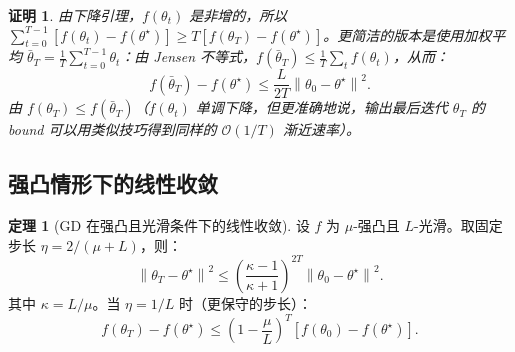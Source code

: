 \documentclass[12pt,a4paper]{ctexart}
\theoremstyle{definition}
\newtheorem{theorem}{定理}[section]
\theoremstyle{plain}
\newtheorem*{proof*}{证明}
\newcommand{\norm}[1]{\left\lVert #1 \right\rVert}
\begin{document}
\begin{proof*}
  由下降引理，$f(\theta_t)$ 是非增的，所以 $\sum_{t=0}^{T-1}[f(\theta_t) - f(\theta^\star)] \ge T[f(\theta_T) - f(\theta^\star)]$。更简洁的版本是使用加权平均
  $\bar\theta_T = \frac1T \sum_{t=0}^{T-1}\theta_t$：由 Jensen 不等式，$f(\bar\theta_T) \le \frac1T\sum_t f(\theta_t)$，从而：
  \begin{equation}
    f(\bar\theta_T) - f(\theta^\star) \le \frac{L}{2T} \norm{\theta_0 - \theta^\star}^2.
  \end{equation}
  由 $f(\theta_T) \le f(\bar\theta_T)$（$f(\theta_t)$ 单调下降，但更准确地说，输出最后迭代 $\theta_T$ 的 bound 可以用类似技巧得到同样的 $\mathcal{O}(1/T)$ 渐近速率）。
\end{proof*}

\subsection{强凸情形下的线性收敛}

\begin{theorem}[GD 在强凸且光滑条件下的线性收敛]\label{thm:gd-strconv}
  设 $f$ 为 $\mu$-强凸且 $L$-光滑。取固定步长 $\eta = 2/(\mu + L)$，则：
  \begin{equation}\label{eq:gd-linear}
    \norm{\theta_T - \theta^\star}^2 \le \left(\frac{\kappa - 1}{\kappa + 1}\right)^{2T} \norm{\theta_0 - \theta^\star}^2.
  \end{equation}
  其中 $\kappa = L/\mu$。当 $\eta = 1/L$ 时（更保守的步长）：
  \begin{equation}\label{eq:gd-linear-simple}
    f(\theta_T) - f(\theta^\star) \le \left(1 - \frac{\mu}{L}\right)^T \left[f(\theta_0) - f(\theta^\star)\right].
  \end{equation}
\end{theorem}
\end{document}
